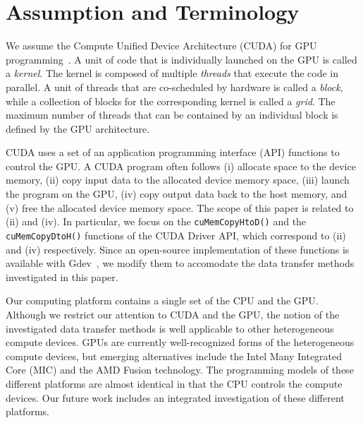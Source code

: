 \section{Assumption and Terminology}
\label{sec:assumption}

We assume the Compute Unified Device Architecture (CUDA) for GPU
programming~\cite{NVIDIA_CUDA}.
A unit of code that is individually launched on the GPU is called
a \textit{kernel}.
The kernel is composed of multiple \textit{threads} that execute the
code in parallel.
A unit of threads that are co-scheduled by hardware is called a
\textit{block}, while a collection of blocks for the corresponding
kernel is called a \textit{grid}.  
The maximum number of threads that can be contained by an individual
block is defined by the GPU architecture.

CUDA uses a set of an application programming interface (API) functions
to control the GPU.
A CUDA program often follows (i) allocate space
to the device memory, (ii) copy input data to the allocated device memory
space, (iii) launch the program on the GPU, (iv) copy output data back
to the host memory, and (v) free the allocated device memory space. 
The scope of this paper is related to (ii) and (iv).
In particular, we focus on the \texttt{cuMemCopyHtoD()} and the
\texttt{cuMemCopyDtoH()} functions of the CUDA Driver API, which
correspond to (ii) and (iv) respectively.
Since an open-source implementation of these functions is available with
Gdev~\cite{Kato_ATC12}, we modify them to accomodate the data transfer
methods investigated in this paper.

Our computing platform contains a single set of the CPU and the GPU.
Although we restrict our attention to CUDA and the GPU, the notion of
the investigated data transfer methods is well applicable to other
heterogeneous compute devices.
GPUs are currently well-recognized forms of the heterogeneous compute
devices, but emerging alternatives include the Intel Many Integrated
Core (MIC) and the AMD Fusion technology.
The programming models of these different platforms are almost identical
in that the CPU controls the compute devices.
Our future work includes an integrated investigation of these different
platforms.
